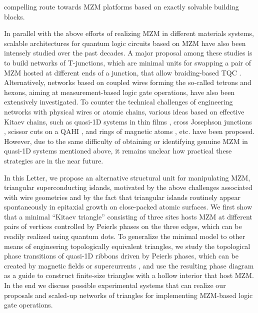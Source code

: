 \documentclass[aps,prb,showpacs,amsmath,twocolumn,amssymb,superscriptaddress]{revtex4-2}
\begin{document}
compelling route towards MZM platforms based on exactly solvable building blocks.

In parallel with the above efforts of realizing MZM in different materials systems, scalable architectures for quantum logic circuits based on MZM have also been intensely studied over the past decades. A major proposal among these studies is to build networks of T-junctions, which are minimal units for swapping a pair of MZM hosted at different ends of a junction, that allow braiding-based TQC \cite{karzigScalableDesignsQuasiparticlepoisoningprotected2017}. Alternatively, networks based on coupled wires forming the so-called tetrons and hexons, aiming at measurement-based logic gate operations, have also been extensively investigated. To counter the technical challenges of engineering networks with physical wires or atomic chains, various ideas based on effective Kitaev chains, such as quasi-1D systems in thin films \cite{potterMultichannelGeneralizationKitaev2010}, cross Josephson junctions \cite{zhouPhaseControlMajorana2020}, scissor cuts on a QAHI \cite{xieCreatingLocalizedMajorana2021}, and rings of magnetic atoms \cite{Li_2016}, etc. have been proposed. However, due to the same difficulty of obtaining or identifying genuine MZM in quasi-1D systems mentioned above, it remains unclear how practical these strategies are in the near future.

In this Letter, we propose an alternative structural unit for manipulating MZM, triangular superconducting islands, motivated by the above challenges associated with wire geometries and by the fact that triangular islands routinely appear spontaneously in epitaxial growth \cite{pietzschSpinResolvedElectronicStructure2006} on close-packed atomic surfaces. We first show that a minimal ``Kitaev triangle'' consisting of three sites hosts MZM at different pairs of vertices controlled by Peierls phases on the three edges, which can be readily realized using quantum dots. To generalize the minimal model to other means of engineering topologically equivalent triangles, we study the topological phase transitions of quasi-1D ribbons driven by Peierls phases, which can be created by magnetic fields or supercurrents \cite{romitoManipulatingMajoranaFermions2012, takasanSupercurrentinducedTopologicalPhase2022}, and use the resulting phase diagram as a guide to construct finite-size triangles with a hollow interior that host MZM. In the end we discuss possible experimental systems that can realize our proposals and scaled-up networks of triangles for implementing MZM-based logic gate operations.
\end{document}
